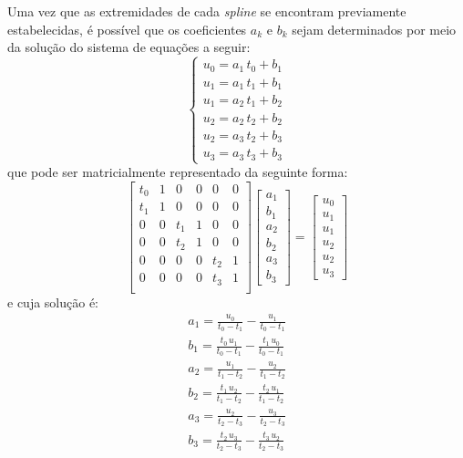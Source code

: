 Uma vez que as extremidades de cada \textit{spline} se encontram previamente estabelecidas, é possível que os coeficientes $ a_k $ e $ b_k $ sejam determinados por meio da solução do sistema de equações a seguir:
%
\begin{equation}
	\label{eq:revisao:splinesLineares}
	\begin{cases}
		u_0 = a_1 \, t_0 + b_1 \\
		u_1 = a_1 \, t_1 + b_1 \\
		u_1 = a_2 \, t_1 + b_2 \\
		u_2 = a_2 \, t_2 + b_2 \\
		u_2 = a_3 \, t_2 + b_3 \\
		u_3 = a_3 \, t_3 + b_3
	\end{cases}
\end{equation}
%
que pode ser matricialmente representado da seguinte forma:
%
\begin{equation}
	\begin{bmatrix}
		t_0 & 1 & 0 & 0 & 0 & 0 \\
		t_1 & 1 & 0 & 0 & 0 & 0 \\
		0 & 0 & t_1 & 1 & 0 & 0 \\
		0 & 0 & t_2 & 1 & 0 & 0 \\
		0 & 0 & 0 & 0 & t_2 & 1 \\
		0 & 0 & 0 & 0 & t_3 & 1 \\
	\end{bmatrix}
	\begin{bmatrix}
		a_1 \\
		b_1 \\
		a_2 \\
		b_2 \\
		a_3 \\
		b_3
	\end{bmatrix}
	=
	\begin{bmatrix}
		u_0 \\
		u_1 \\
		u_1 \\
		u_2 \\
		u_2 \\
		u_3
	\end{bmatrix}
\end{equation}
e cuja solução é:
%
\begin{equation}
	\begin{gathered}
		a_1 = \frac{u_0}{t_0 - t_1} - \frac{u_1}{t_0 - t_1} \\
		b_1 = \frac{t_0 \, u_1}{t_0 - t_1} - \frac{t_1 \, u_0}{t_0 - t_1} \\
		a_2 = \frac{u_1}{t_1 - t_2} - \frac{u_2}{t_1 - t_2} \\
		b_2 = \frac{t_1 \, u_2}{t_1 - t_2} - \frac{t_2 \, u_1}{t_1 - t_2} \\
		a_3 = \frac{u_2}{t_2 - t_3} - \frac{u_3}{t_2 - t_3} \\
		b_3 = \frac{t_2 \, u_3}{t_2 - t_3} - \frac{t_3 \, u_2}{t_2 - t_3}
	\end{gathered}
\end{equation}


